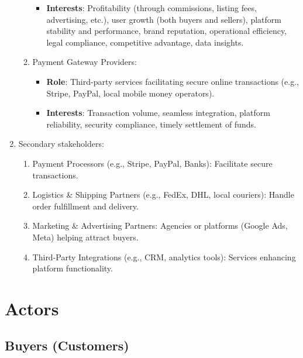 \documentclass[a4paper,12pt]{article}
\begin{document}
\begin{enumerate}
\begin{enumerate}
\begin{itemize}
                        \item \textbf{Interests}: Profitability (through commissions, listing fees, advertising, etc.), user growth (both buyers and sellers), platform stability and performance, brand reputation, operational efficiency, legal compliance, competitive advantage, data insights.
                    \end{itemize}
              \item Payment Gateway Providers:
                    \begin{itemize}
                        \item \textbf{Role}: Third-party services facilitating secure online transactions (e.g., Stripe, PayPal, local mobile money operators).
                        \item \textbf{Interests}: Transaction volume, seamless integration, platform reliability, security compliance, timely settlement of funds.
                    \end{itemize}
          \end{enumerate}
    \item Secondary stakeholders:
          \begin{enumerate}
              \item Payment Processors (e.g., Stripe, PayPal, Banks): Facilitate secure transactions.

              \item Logistics \& Shipping Partners (e.g., FedEx, DHL, local couriers): Handle order fulfillment and delivery.

              \item Marketing \& Advertising Partners: Agencies or platforms (Google Ads, Meta) helping attract buyers.

              \item Third-Party Integrations (e.g., CRM, analytics tools): Services enhancing platform functionality.
          \end{enumerate}
\end{enumerate}

\section{Actors}

\subsection{Buyers (Customers)}
\end{document}
